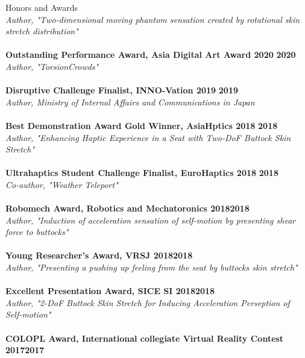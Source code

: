 \documentclass{resume} %
\begin{document}
\begin{rSection}{Honors and Awards}
\\{\em Author, "Two-dimensional moving phantom sensation created by rotational skin stretch distribution"} \\
\vspace{-3mm}
\\{\bf Outstanding Performance Award, Asia Digital Art Award 2020} \hfill {\bf 2020}
\\{\em Author, "TorsionCrowds"} \\
\vspace{-3mm}
\\{\bf Disruptive Challenge Finalist, INNO-Vation 2019} \hfill {\bf 2019}
\\{\em Author, Ministry of Internal Affairs and Communications in Japan} \\
\vspace{-3mm}
\\{\bf Best Demonstration Award Gold Winner, AsiaHptics 2018} \hfill {\bf 2018}
\\{\em Author, "Enhancing Haptic Experience in a Seat with Two-DoF Buttock Skin Stretch"} \\
\vspace{-3mm}
\\{\bf Ultrahaptics Student Challenge Finalist, EuroHaptics 2018} \hfill {\bf 2018}
\\{\em Co-author, "Weather Teleport"} \\
\vspace{-3mm}
\\{\bf Robomech Award, Robotics and Mechatoronics 2018}\hfill {\bf 2018}
\\{\em Author, "Induction of acceleration sensation of self-motion by presenting shear force to buttocks"} \\
\vspace{-3mm}
\\{\bf Young Researcher's Award, VRSJ 2018}\hfill {\bf 2018}
\\{\em Author, "Presenting a pushing up feeling from the seat by buttocks skin stretch"} \\
\vspace{-3mm}
\\{\bf Excellent Presentation Award, SICE SI 2018}\hfill {\bf 2018}
\\{\em Author, "2-DoF Buttock Skin Stretch for Inducing Acceleration Perseption of Self-motion"} \\
\vspace{-3mm}
\\{\bf COLOPL Award, International collegiate Virtual Reality Contest 2017}\hfill {\bf 2017}

\end{rSection}
\end{document}
